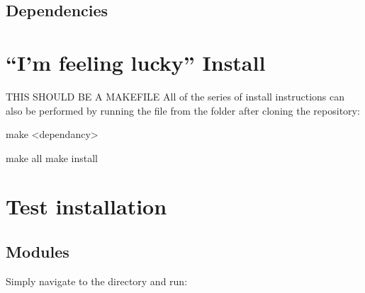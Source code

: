 \documentclass[letterpaper,10pt,english]{sphinxmanual}
\begin{document}
\subsection{Dependencies}
\label{\detokenize{introduction/introduction:dependencies}}
%
\begin{sphinxVerbatim}[commandchars=\\\{\}]
\end{sphinxVerbatim}


\section{“I’m feeling lucky” Install}
\label{\detokenize{introduction/introduction:i-m-feeling-lucky-install}}
THIS SHOULD BE A MAKEFILE
All of the series of install instructions can also be performed by running the  file from the  folder after cloning the repository:

make \textless{}dependancy\textgreater{}

%
\begin{sphinxVerbatim}[commandchars=\\\{\}]
make all
make install
\end{sphinxVerbatim}


\section{Test installation}
\label{\detokenize{introduction/introduction:test-installation}}

\subsection{Modules}
\label{\detokenize{introduction/introduction:modules}}
Simply navigate to the  directory and run:
\end{document}
